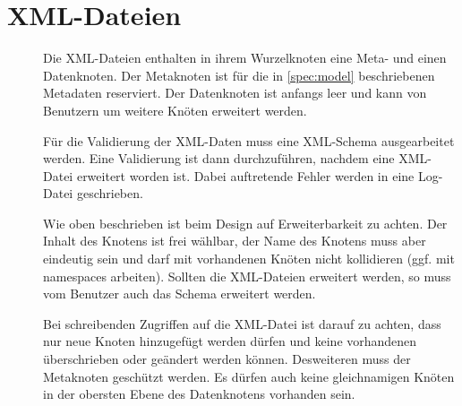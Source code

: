 \section{XML-Dateien} \label{spec:xml}
\begin{description}
	\item []
		Die XML-Dateien enthalten in ihrem Wurzelknoten eine Meta- und einen Datenknoten.
		Der Metaknoten ist für die in \ref{spec:model} beschriebenen Metadaten reserviert.
		Der Datenknoten ist anfangs leer und kann von Benutzern um weitere Knöten erweitert werden.
	\item []
		Für die Validierung der XML-Daten muss eine XML-Schema ausgearbeitet werden.
		Eine Validierung ist dann durchzuführen, nachdem eine XML-Datei erweitert worden ist.
		Dabei auftretende Fehler werden in eine Log-Datei geschrieben.
	\item []
		Wie oben beschrieben ist beim Design auf Erweiterbarkeit zu achten.
		Der Inhalt des Knotens ist frei wählbar, der Name des Knotens muss aber
		eindeutig sein und darf mit vorhandenen Knöten nicht kollidieren
		(ggf. mit namespaces arbeiten).
		Sollten die XML-Dateien erweitert werden, so muss vom Benutzer auch das Schema erweitert werden.
	\item []
		Bei schreibenden Zugriffen auf die XML-Datei ist darauf zu achten, 
		dass nur neue Knoten hinzugefügt werden dürfen und
		keine vorhandenen überschrieben oder geändert werden können.
		Desweiteren muss der Metaknoten geschützt werden.
		Es dürfen auch keine gleichnamigen Knöten in der obersten Ebene des Datenknotens
		vorhanden sein.
\end{description}
	
